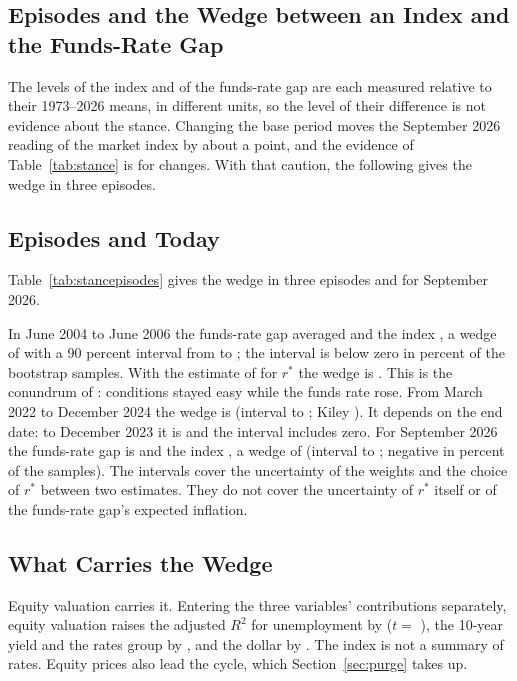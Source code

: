 \documentclass[11pt]{article}
\newcommand{\rs}{r^{*}}
\begin{document}
\begin{appendices}
\section{Episodes and the Wedge between an Index and the Funds-Rate Gap}\label{app:episodes}
The levels of the index and of the funds-rate gap are each measured relative to their 1973--2026 means, in different units, so the level of their difference is not evidence about the stance. Changing the base period moves the September 2026 reading of the market index by about a point, and the evidence of Table~\ref{tab:stance} is for changes. With that caution, the following gives the wedge in three episodes.
\subsection{Episodes and Today}\label{sec:episodes}
Table~\ref{tab:stancepisodes} gives the wedge in three episodes and for September 2026.



In June 2004 to June 2006 the funds-rate gap averaged  and the index , a wedge of  with a 90 percent interval from  to ; the interval is below zero in  percent of the bootstrap samples. With the estimate of \citet{kiley2020} for $\rs$ the wedge is . This is the conundrum of \citet{hatzius2010}: conditions stayed easy while the funds rate rose. From March 2022 to December 2024 the wedge is  (interval  to ; Kiley ). It depends on the end date: to December 2023 it is  and the interval includes zero. For September 2026 the funds-rate gap is  and the index , a wedge of  (interval  to ; negative in  percent of the samples). The intervals cover the uncertainty of the weights and the choice of $\rs$ between two estimates. They do not cover the uncertainty of $\rs$ itself or of the funds-rate gap's expected inflation.

\subsection{What Carries the Wedge}\label{sec:carries}
Equity valuation carries it. Entering the three variables' contributions separately, equity valuation raises the adjusted $R^2$ for unemployment by  ($t=$ ), the 10-year yield and the rates group by , and the dollar by . The index is not a summary of rates. Equity prices also lead the cycle, which Section~\ref{sec:purge} takes up.
\FloatBarrier


\end{appendices}
\end{document}
